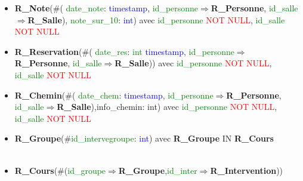 \documentclass{article}
\begin{document}
\begin{itemize}
\item \textbf{R\_Note}(\#(\textcolor{green}{ date\_note}: \textcolor{blue}{ timestamp},\textcolor{green}{ id\_personne}$\Rightarrow$\textbf{R\_Personne},\textcolor{green}{ id\_salle}$\Rightarrow$\textbf{R\_Salle}),\textcolor{green}{ note\_sur\_10}: \textcolor{blue}{ int}) avec \textcolor{green}{ id\_personne} \textcolor{red}{NOT NULL}, \textcolor{green}{ id\_salle} \textcolor{red}{NOT NULL} \\

\item \textbf{R\_Reservation}(\#(\textcolor{green}{ date\_res}:\textcolor{green}{ int} \textcolor{blue}{ timestamp},\textcolor{green}{ id\_personne}$\Rightarrow$\textbf{R\_Personne},\textcolor{green}{ id\_salle}$\Rightarrow$\textbf{R\_Salle})) avec \textcolor{green}{ id\_personne} \textcolor{red}{NOT NULL},  \textcolor{green}{ id\_salle} \textcolor{red}{NOT NULL} \\

\item \textbf{R\_Chemin}(\#(\textcolor{green}{ date\_chem}: \textcolor{blue}{ timestamp},\textcolor{green}{ id\_personne}$\Rightarrow$\textbf{R\_Personne},\textcolor{green}{ id\_salle}$\Rightarrow$\textbf{R\_Salle}),info\_chemin: int) avec \textcolor{green}{ id\_personne} \textcolor{red}{NOT NULL}, \textcolor{green}{ id\_salle} \textcolor{red}{NOT NULL} \\


\item \textbf{R\_Groupe}(\#\textcolor{green}{id\_intervegroupe}: \textcolor{blue}{int}) avec \textbf{R\_Groupe} IN \textbf{R\_Cours}\\\\

\item \textbf{R\_Cours}(\#(\textcolor{green}{id\_groupe}$\Rightarrow$\textbf{R\_Groupe},\textcolor{green}{id\_inter}$\Rightarrow$\textbf{R\_Intervention}))\\






\end{itemize}
\end{document}
